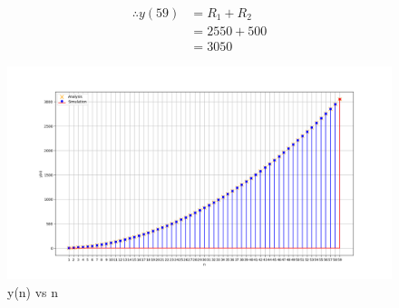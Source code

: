 \documentclass[journal,12pt,twocolumn]{IEEEtran}
\begin{document}
	\begin{align}
		\therefore y(59)&= R_1 + R_2 \\
		 &= 2550 + 500\\
		 &= 3050
	\end{align}
	\begin{figure}[ht]
		\includegraphics[width = \columnwidth]{figs/fig1}
		\caption{y(n) vs n}
		\centering
		\label{fig: fig1}
	\end{figure}
\end{document}
